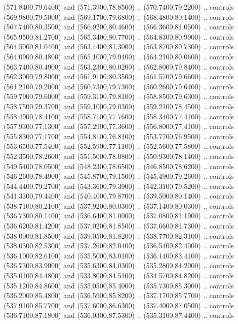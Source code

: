 {\begin{scope}[y=0.80pt, x=0.80pt, yscale=-1, xscale=1, inner sep=0pt, outer sep=0pt, #1]
      (571.8400,79.6400) and (571.3900,78.8500) .. (570.7400,79.2200) .. controls
      (569.9800,79.5000) and (569.1700,79.6800) .. (568.4800,80.1400) .. controls
      (567.7400,80.3500) and (566.9200,80.4600) .. (566.3600,81.0500) .. controls
      (565.9500,81.2700) and (565.3400,80.7700) .. (564.8300,80.9900) .. controls
      (564.5000,81.0400) and (563.4400,81.3000) .. (563.8700,80.7300) .. controls
      (564.0900,80.4800) and (565.1000,79.9400) .. (564.2100,80.0600) .. controls
      (563.7400,80.4900) and (563.2300,80.0200) .. (562.8000,79.8400) .. controls
      (562.3000,79.8000) and (561.9100,80.3500) .. (561.5700,79.6600) .. controls
      (561.2100,79.2000) and (560.7300,79.7300) .. (560.2600,79.6400) .. controls
      (559.7900,79.6000) and (559.3100,79.8100) .. (558.8500,79.6300) .. controls
      (558.7500,79.3700) and (559.1000,79.0300) .. (559.2100,78.4500) .. controls
      (558.4900,78.4100) and (558.7100,77.7600) .. (558.3400,77.4100) .. controls
      (557.9300,77.1300) and (557.2900,77.3600) .. (556.8000,77.4100) .. controls
      (555.8300,77.1700) and (554.8100,76.8100) .. (553.7700,76.9500) .. controls
      (553.6500,77.5400) and (552.5900,77.1100) .. (552.5600,77.5800) .. controls
      (552.3500,78.2600) and (551.5000,78.0800) .. (550.9300,78.1400) .. controls
      (549.5400,78.0500) and (548.2300,78.6500) .. (546.8500,78.6200) .. controls
      (546.2600,78.4900) and (545.8700,79.1500) .. (545.4900,79.2600) .. controls
      (544.4400,79.2700) and (543.3600,79.3900) .. (542.3100,79.5200) .. controls
      (541.3300,79.4400) and (540.4000,79.8700) .. (539.5000,80.1400) .. controls
      (538.7100,80.2100) and (537.9200,80.0300) .. (537.1400,80.0300) .. controls
      (536.7300,80.1400) and (536.6400,81.0000) .. (537.0800,81.1900) .. controls
      (536.6200,81.4200) and (537.0200,81.8500) .. (537.6600,81.7300) .. controls
      (538.0000,81.8500) and (539.0500,81.8200) .. (538.7700,82.3100) .. controls
      (538.0300,82.5300) and (537.2600,82.0400) .. (536.5400,82.4000) .. controls
      (536.1000,82.6100) and (535.5000,83.0100) .. (536.1400,83.4100) .. controls
      (536.7300,83.9000) and (535.6300,84.0300) .. (535.2800,84.2000) .. controls
      (535.0100,84.4800) and (533.8000,84.5100) .. (534.5700,84.8200) .. controls
      (535.1200,84.8600) and (535.0500,85.4000) .. (535.7300,85.3000) .. controls
      (536.2000,85.4800) and (536.5900,85.8200) .. (537.1700,85.7700) .. controls
      (537.9100,85.7700) and (537.6000,86.6300) .. (537.4000,87.0500) .. controls
      (536.7100,87.1800) and (536.0300,87.5300) .. (535.3100,87.4400) .. controls

\end{scope}}
